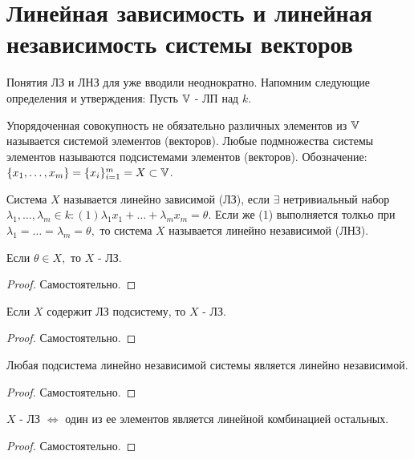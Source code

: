 \documentclass[../main.tex]{subfiles}
\begin{document}
\section{Линейная зависимость и линейная независимость системы векторов}
Понятия ЛЗ и ЛНЗ для уже вводили неоднократно. Напомним следующие определения и утверждения: Пусть $\mathbb{V} $ - ЛП над $k$. 
\begin{definition}
    Упорядоченная совокупность не обязательно различных элементов из $\mathbb{V}$ называется системой элементов (векторов). Любые подмножества системы элементов называются подсистемами элементов (векторов). Обозначение: $\{x_{1},\dots,x_{m}\}=\{x_{i}\}_{i=1}^{m}=X\subset \mathbb{V}$. 
\end{definition}
\begin{definition}
    Система $X$ называется линейно зависимой (ЛЗ), если $\exists$ нетривиальный набор $\lambda_{1},\dots,\lambda_{m}\in k: (1) \lambda_{1}x_{1}+\dots+\lambda_{m}x_{m}=\theta$. Если же (1) выполняется толкьо при $\lambda_{1}=\dots=\lambda_{m}=\theta,$ то система $X$ называется линейно независимой (ЛНЗ).
\end{definition}
\begin{theorem}
    Если $\theta \in X,$ то $X$ - ЛЗ.
\end{theorem}
\begin{proof}
    Самостоятельно.
\end{proof}
\begin{theorem}
    Если $X$ содержит ЛЗ подсистему, то $X$ - ЛЗ. 
\end{theorem}
\begin{proof}
    Самостоятельно.
\end{proof}
\begin{theorem}
    Любая подсистема линейно независимой системы является линейно независимой.
\end{theorem}
\begin{proof}
    Самостоятельно.
\end{proof}
\begin{theorem}[Критерий ЛЗ]
    $X$ - ЛЗ $\Leftrightarrow$ один из ее элементов является линейной комбинацией остальных.
\end{theorem}
\begin{proof}
    Самостоятельно.
\end{proof}
\end{document}
